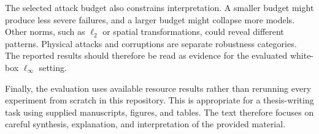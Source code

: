 The selected attack budget also constrains interpretation. A smaller budget might produce less severe failures, and a larger budget might collapse more models. Other norms, such as $\ell_2$ or spatial transformations, could reveal different patterns. Physical attacks and corruptions are separate robustness categories. The reported results should therefore be read as evidence for the evaluated white-box $\ell_\infty$ setting.

Finally, the evaluation uses available resource results rather than rerunning every experiment from scratch in this repository. This is appropriate for a thesis-writing task using supplied manuscripts, figures, and tables. The text therefore focuses on careful synthesis, explanation, and interpretation of the provided material.
